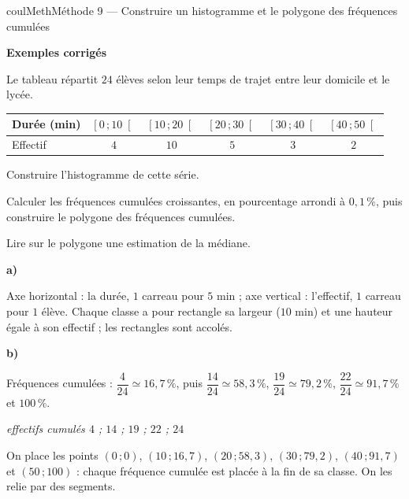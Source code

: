 \documentclass[11pt,a4paper]{article}
\makeatletter
\renewcommand{\approx}{\simeq}
\newcommand{\quadrillage}[4]{\draw[grille,step=1] (#1,#2) grid (#3,#4);}
\newcommand{\lycee@intfo}[2]{\left[#1\,;#2\right[}
\providecommand{\intfo}{\lycee@intfo}%
\newcounter{lycee@signet}
\newcommand{\signet}[3][]{\stepcounter{lycee@signet}%
  \edef\lycee@dest{\if\relax\detokenize{#1}\relax
    signet.\arabic{lycee@signet}\else#1\fi}%
  \hypertarget{\lycee@dest}{}\bookmark[level=#2,dest=\lycee@dest]{#3}}
\newcommand{\res}[1]{#1}
\newcounter{methode}
\newenvironment{methodebox}[1][Méthode]{\stepcounter{methode}%
  \begin{boitecours}[phantom={\signet[methode-\arabic{methode}]{2}{#1}}]{coulMeth}{#1}}%
  {\end{boitecours}}
\newcommand{\etape}[1]{\par\smallskip\textbf{\color{coulMeth}#1}\par\nobreak\smallskip}
\newcommand{\explique}[2]{\par\smallskip\noindent
  \begin{minipage}[t]{0.57\linewidth}\raggedright #1\end{minipage}\hfill
  \begin{minipage}[t]{0.40\linewidth}\raggedright\leavevmode
    {\small\itshape\color{black!60}#2}\end{minipage}\par}
\newcommand{\cas}[1]{\par\smallskip\noindent\textbf{\color{coulExo}#1}\vadjust{\nobreak}}
\newenvironment{correction}{\par}{\par}
\newcommand{\etapeexemples}{\etape{Exemples corrigés}}
\makeatother
\begin{document}
\begin{methodebox}[Méthode 9 --- Construire un histogramme et le polygone des fréquences cumulées]
\etapeexemples
Le tableau répartit $24$ élèves selon leur temps de trajet entre leur domicile et le
lycée.
\begin{center}
\renewcommand{\arraystretch}{1.5}
\begin{tabular}{|l|*{5}{c|}}
\hline
Durée (min) & $\intfo{0}{10}$ & $\intfo{10}{20}$ & $\intfo{20}{30}$ & $\intfo{30}{40}$
  & $\intfo{40}{50}$\\\hline
Effectif & $4$ & $10$ & $5$ & $3$ & $2$\\\hline
\end{tabular}
\end{center}
\begin{questions}[label=\alph*)]
  \item Construire l'histogramme de cette série.
  \item Calculer les fréquences cumulées croissantes, en pourcentage arrondi à
    $0{,}1\,\%$, puis construire le polygone des fréquences cumulées.
  \item Lire sur le polygone une estimation de la médiane.
\end{questions}
\begin{correction}
\cas{a)}
\par\nopagebreak
\begin{minipage}[c]{0.5\linewidth}\raggedright
Axe horizontal : la durée, $1$ carreau pour $5$ min ; axe vertical : l'effectif,
$1$ carreau pour $1$ élève. Chaque classe a pour rectangle sa largeur ($10$ min)
et une hauteur égale à son effectif ; les rectangles sont accolés.
\end{minipage}\hfill
\begin{minipage}[c]{0.46\linewidth}\centering
{}
\end{minipage}
\cas{b)}
\explique{Fréquences cumulées : $\dfrac{4}{24}\approx 16{,}7\,\%$, puis
$\dfrac{14}{24}\approx 58{,}3\,\%$, $\dfrac{19}{24}\approx 79{,}2\,\%$,
$\dfrac{22}{24}\approx 91{,}7\,\%$ et \res{$100\,\%$}.}{effectifs cumulés $4$ ; $14$ ;
$19$ ; $22$ ; $24$}
\par\nopagebreak
\begin{minipage}[c]{0.5\linewidth}\raggedright
On place les points $(0\,;0)$, $(10\,;16{,}7)$, $(20\,;58{,}3)$, $(30\,;79{,}2)$,
$(40\,;91{,}7)$ et $(50\,;100)$ : chaque fréquence cumulée est placée à la fin de sa
classe. On les relie par des segments.


\end{minipage}
\end{correction}
\end{methodebox}
\end{document}
